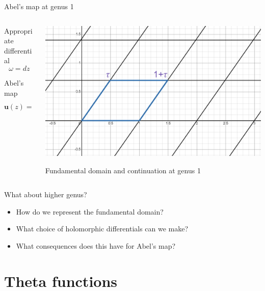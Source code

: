\documentclass[11pt,aspectratio=169]{beamer}
\begin{document}
\begin{frame}{Abel's map at genus 1}
    \begin{columns}[onlytextwidth]
        \begin{column}{0.55\textwidth}
            Appropriate differential
            \[\omega = dz\]
            
            Abel's map
            \[\mathbf{u}(z) = \int_0^z \omega = z\]
        \end{column}
        \begin{column}{0.45\textwidth}
            \center{}
            \includegraphics[width=\columnwidth]{assets/Domain.png}

            \tiny Fundamental domain and continuation at genus 1
        \end{column}
    \end{columns}


    {
    \begin{block}{What about higher genus?}
        \begin{itemize}
            \item How do we represent the fundamental domain?
            \item What choice of holomorphic differentials can we make?
            \item What consequences does this have for Abel's map?
        \end{itemize}
    \end{block}
    }
\end{frame}

\section{Theta functions}
\end{document}
